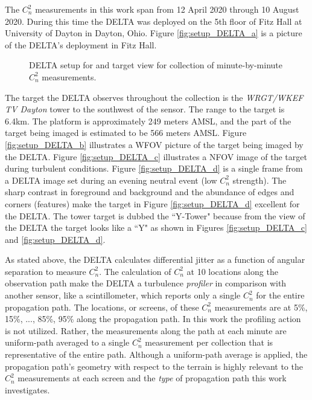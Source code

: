 The $C_{n}^{2}$ measurements in this work span from 12 April 2020 through 10 August 2020. During this time the \ac{DELTA} was deployed on the 5th floor of Fitz Hall at University of Dayton in Dayton, Ohio. Figure \ref{fig:setup_DELTA_a} is a picture of the \ac{DELTA}'s deployment in Fitz Hall.
\begin{figure}[p!]
	\centering
	\hfill
	\hfill
	\caption{DELTA setup for and target view for collection of minute-by-minute $C_{n}^{2}$ measurements.}
	\label{fig:setup_DELTA}
\end{figure}
The target the \ac{DELTA} observes throughout the collection is the \textit{WRGT/WKEF TV Dayton} tower to the southwest of the sensor. The range to the target is 6.4km. The platform is approximately 249 meters \ac{AMSL}, and the part of the target being imaged is estimated to be 566 meters \ac{AMSL}. Figure \ref{fig:setup_DELTA_b} illustrates a \ac{WFOV} picture of the target being imaged by the \ac{DELTA}. Figure \ref{fig:setup_DELTA_c} illustrates a \ac{NFOV} image of the target during  turbulent conditions. Figure \ref{fig:setup_DELTA_d} is a single frame from a \ac{DELTA} image set during an evening neutral event (low $C_{n}^{2}$ strength). The sharp contrast in foreground and background and the abundance of edges and corners (features) make the target in Figure \ref{fig:setup_DELTA_d} excellent for the \ac{DELTA}. The tower target is dubbed the ``Y-Tower" because from the view of the \ac{DELTA} the target looks like a ``Y" as shown in Figures \ref{fig:setup_DELTA_c} and \ref{fig:setup_DELTA_d}.

As stated above, the \ac{DELTA} calculates differential jitter as a function of angular separation to measure $C_{n}^{2}$. The calculation of $C_{n}^{2}$ at 10 locations along the observation path make the \ac{DELTA} a turbulence \emph{profiler} in comparison with another sensor, like a scintillometer, which reports only a single $C_{n}^{2}$ for the entire propagation path. The locations, or screens, of these $C_{n}^{2}$ measurements are at 5\%, 15\%, ..., 85\%, 95\% along the propagation path. In this work the profiling action is not utilized. Rather, the measurements along the path at each minute are uniform-path averaged to a single $C_{n}^{2}$ measurement per collection that is representative of the entire path. Although a uniform-path average is applied, the propagation path's geometry with respect to the terrain is highly relevant to the $C_{n}^{2}$ measurements at each screen and the \emph{type} of propagation path this work investigates.

